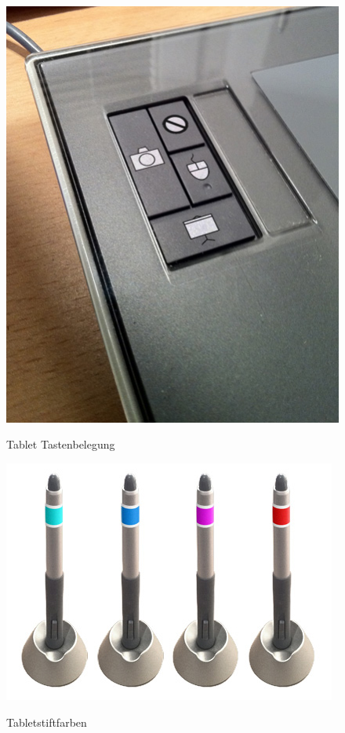 \begin{figure}
	\begin{center}
        {\includegraphics[width=0.8\linewidth]{gfx/scribblerTabletTasten}}
		\caption[Tablet Tastenbelegung]{Tablet Tastenbelegung}\label{fig:scribblerTabletTasten}
	\end{center}
\end{figure}
\begin{figure}
        {\includegraphics[width=1\linewidth]{gfx/scribblerColors}}
		\caption[Tabletstiftfarben]{Tabletstiftfarben}\label{fig:scribblerColors}
\end{figure}
